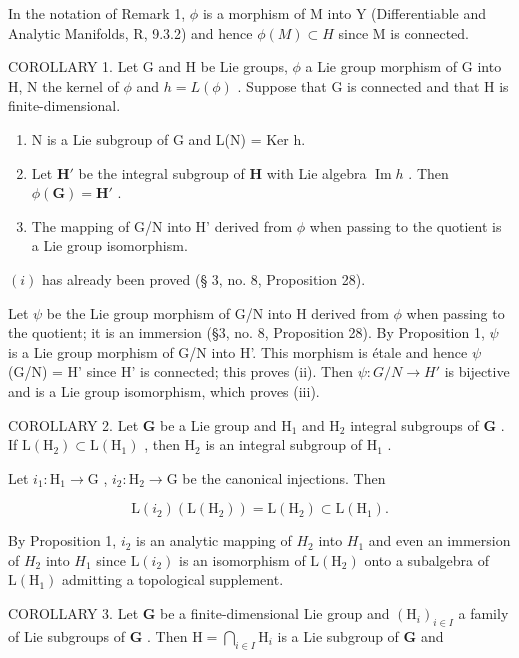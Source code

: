 In the notation of Remark 1, \(\phi\) is a morphism of M into Y (Differentiable and Analytic Manifolds, R, 9.3.2) and hence \(\phi(M) \subset H\) since M is connected.

COROLLARY 1. Let G and H be Lie groups, \(\phi\) a Lie group morphism of G into H, N the kernel of \(\phi\) and \(h = L(\phi)\) . Suppose that G is connected and that H is finite-dimensional.

\begin{enumerate}
\def\labelenumi{(\roman{enumi})}
\item
  N is a Lie subgroup of G and L(N) = Ker h.
\item
  Let \(\mathbf{H}'\) be the integral subgroup of \(\mathbf{H}\) with Lie algebra \(\operatorname{Im} h\) . Then \(\phi(\mathbf{G}) = \mathbf{H}'\) .
\item
  The mapping of G/N into H' derived from \(\phi\) when passing to the quotient is a Lie group isomorphism.
\end{enumerate}

\((i)\) has already been proved (§ 3, no. 8, Proposition 28).

Let \(\psi\) be the Lie group morphism of G/N into H derived from \(\phi\) when passing to the quotient; it is an immersion (§3, no. 8, Proposition 28). By Proposition 1, \(\psi\) is a Lie group morphism of G/N into H'. This morphism is étale and hence \(\psi\) (G/N) = H' since H' is connected; this proves (ii). Then \(\psi\colon G/N \to H'\) is bijective and is a Lie group isomorphism, which proves (iii).

COROLLARY 2. Let \(\mathbf{G}\) be a Lie group and \(\mathrm{H}_1\) and \(\mathrm{H}_2\) integral subgroups of \(\mathbf{G}\) . If \(\mathrm{L}(\mathrm{H}_2) \subset \mathrm{L}(\mathrm{H}_1)\) , then \(\mathrm{H}_2\) is an integral subgroup of \(\mathrm{H}_1\) .

Let \(i_1: \mathrm{H}_1 \to \mathrm{G}\) , \(i_2: \mathrm{H}_2 \to \mathrm{G}\) be the canonical injections. Then

\[
\mathrm{L} (i _ {2}) (\mathrm{L} (\mathrm{H} _ {2})) = \mathrm{L} (\mathrm{H} _ {2}) \subset \mathrm{L} (\mathrm{H} _ {1}).
\]

By Proposition 1, \(i_{2}\) is an analytic mapping of \(H_{2}\) into \(H_{1}\) and even an immersion of \(H_{2}\) into \(H_{1}\) since \(\mathrm{L}(i_{2})\) is an isomorphism of \(\mathrm{L}(\mathrm{H}_{2})\) onto a subalgebra of \(\mathrm{L}(\mathrm{H}_{1})\) admitting a topological supplement.

COROLLARY 3. Let \(\mathbf{G}\) be a finite-dimensional Lie group and \((\mathrm{H}_i)_{i\in I}\) a family of Lie subgroups of \(\mathbf{G}\) . Then \(\mathrm{H} = \bigcap_{i\in I}\mathrm{H}_i\) is a Lie subgroup of \(\mathbf{G}\) and

